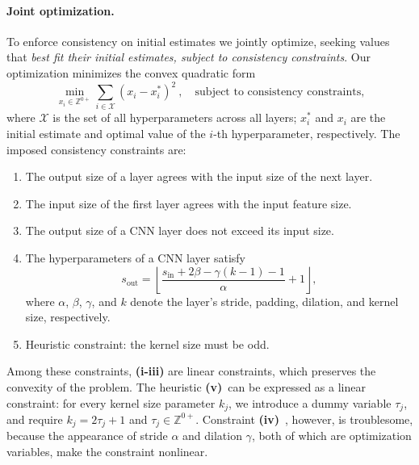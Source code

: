 \documentclass[12pt]{report}
\newcommand{\Liv}{\textbf{(iv)}\ }
\newcommand{\Lv}{\textbf{(v)}\ }
\begin{document}
\paragraph{Joint optimization.}
To enforce consistency on initial estimates we jointly optimize, 
seeking values that
\emph{best fit their initial estimates, subject to consistency constraints}.
Our optimization minimizes the convex quadratic form
\begin{equation}\label{eq:opt}
    \min_{x_i\in\mathbb{Z}^{0+}}\sum_{i\in\mathcal{X}} \left(x_i - x^*_i\right)^2 \ ,\quad
    \textrm{subject to consistency constraints,}
\end{equation}
where $\mathcal{X}$ is the set of all hyperparameters across all layers; $x^*_i$ and $x_i$
are the initial estimate and optimal value of the $i$-th hyperparameter, respectively.
The imposed consistency constraints are:
\begin{enumerate}[topsep=0mm, partopsep=0mm, leftmargin=7mm, label=(\roman*)]
    \item The output size of a layer agrees with the input size of the next layer.
    \item The input size of the first layer agrees with the input feature size.
    \item The output size of a CNN layer does not exceed its input size.
    \item The hyperparameters of a CNN layer satisfy
          \begin{equation}\label{eq:const}
              s_{\text{out}} = \left\lfloor{\frac{s_\text{in}+2\beta-\gamma(k-1)-1}{\alpha}+1}\right\rfloor,
          \end{equation}
          where $\alpha$, $\beta$, $\gamma$, and $k$ denote the layer's stride, padding, dilation, and kernel size, respectively.
    \item Heuristic constraint: the kernel size must be odd.
\end{enumerate}

Among these constraints, \textbf{(i-iii)} are linear constraints, 
which preserves the convexity of the problem.
The heuristic \Lv can be expressed as a linear constraint: 
for every kernel size parameter $k_j$, we introduce a dummy variable
$\tau_j$, and require $k_j = 2\tau_j+1$ and $\tau_j\in \mathbb{Z}^{0+}$.
Constraint \Liv, however, is troublesome, because the appearance of stride $\alpha$
and dilation $\gamma$, both of which are optimization variables, make the 
constraint nonlinear.
\end{document}
